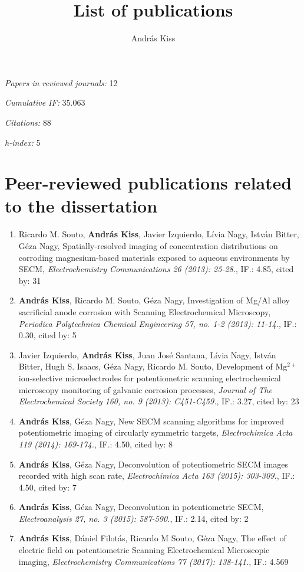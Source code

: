 \documentclass[11pt,a4paper,roman]{article}
\title{List of publications}
\author{András Kiss}
\begin{document}
\maketitle

\begin{center}
\emph{Papers in reviewed journals:} 12

\emph{Cumulative IF:} 35.063

\emph{Citations:} 88

\emph{h-index:} 5
\end{center}

\section{Peer-reviewed publications related to the dissertation}
\begin{enumerate}

\item Ricardo M. Souto, \textbf{András Kiss}, Javier Izquierdo, Lívia Nagy, István Bitter, Géza Nagy, Spatially-resolved imaging of concentration distributions on corroding mag\-ne\-si\-um-based materials exposed to aqueous environments by SECM, \emph{Electrochemistry Communications 26 (2013): 25-28.}, IF.: 4.85, cited by: 31

\item \textbf{András Kiss}, Ricardo M. Souto, Géza Nagy, Investigation of Mg/Al alloy sacrificial anode corrosion with Scanning Electrochemical Microscopy, \emph{Periodica Polytechnica Chemical Engineering 57, no. 1-2 (2013): 11-14.}, IF.: 0.30, cited by: 5

\item Javier Izquierdo, \textbf{András Kiss}, Juan José Santana, Lívia Nagy, István Bitter, Hugh S. Isaacs, Géza Nagy, Ricardo M. Souto, Development of Mg$^{2+}$ ion-selective microelectrodes for potentiometric scanning electrochemical microscopy monitoring of galvanic corrosion processes, \emph{Journal of The Electrochemical Society 160, no. 9 (2013): C451-C459.}, IF.: 3.27, cited by: 23

\item \textbf{András Kiss}, Géza Nagy, New SECM scanning algorithms for improved potentiometric imaging of circularly symmetric targets, \emph{Electrochimica Acta 119 (2014): 169-174.}, IF.: 4.50, cited by: 8

\item \textbf{András Kiss}, Géza Nagy, Deconvolution of potentiometric SECM images recorded with high scan rate, \emph{Electrochimica Acta 163 (2015): 303-309.}, IF.: 4.50, cited by: 7

\item \textbf{András Kiss}, Géza Nagy, Deconvolution in potentiometric SECM, \emph{Electroanalysis 27, no. 3 (2015): 587-590.}, IF.: 2.14, cited by: 2


\item \textbf{András Kiss}, Dániel Filotás, Ricardo M Souto, Géza Nagy, The effect of electric field on potentiometric Scanning Electrochemical Microscopic imaging, \emph{Electrochemistry Communications 77 (2017): 138-141.}, IF.: 4.569
\end{enumerate}
\end{document}
